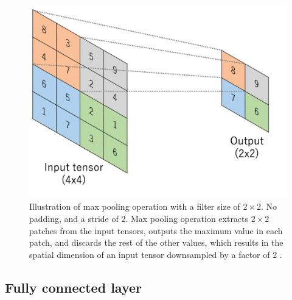 \begin{figure}[H]
        \begin{center}
	    \includegraphics[scale=0.50]{images/Fundamentals/PoolingLayer.png}
	    \caption[Illustration of Max Pooling Operation.]{Illustration of max pooling operation with a filter size of $2 \times 2$. No padding, and a stride of 2. Max pooling operation extracts $2 \times 2$ patches from the input tensors, outputs the maximum value in each patch, and discards the rest of the other values, which results in the spatial dimension of an input tensor downsampled by a factor of 2 \cite{articleCNNs}.}
	    \label{fig:PoolingLayer}
	    \end{center}
\end{figure}



\subsection{Fully connected layer}

